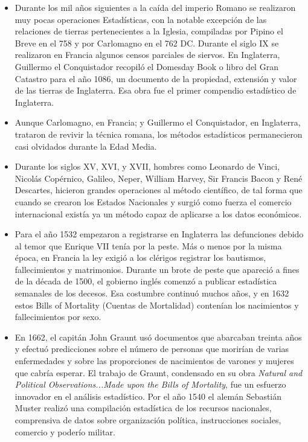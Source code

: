 \begin{itemize}
    \item Durante los mil a\~nos siguientes a la ca\'ida del imperio Romano se realizaron muy pocas operaciones Estad\'isticas, con la notable excepci\'on de las relaciones de tierras pertenecientes a la Iglesia, compiladas por Pipino el Breve en el 758 y por Carlomagno en el 762 DC. Durante el siglo IX se realizaron en Francia algunos censos parciales de siervos. En Inglaterra, Guillermo el Conquistador recopil\'o el Domesday Book o libro del Gran Catastro para el a\~no 1086, un documento de la propiedad, extensi\'on y valor de las tierras de Inglaterra. Esa obra fue el primer compendio estad\'istico de Inglaterra. 
    \item Aunque Carlomagno, en Francia; y Guillermo el Conquistador, en Inglaterra, trataron de revivir la t\'ecnica romana, los m\'etodos estad\'isticos permanecieron casi olvidados durante la Edad Media.
    \item Durante los siglos XV, XVI, y XVII, hombres como Leonardo de Vinci, Nicol\'as Cop\'ernico, Galileo, Neper, William Harvey, Sir Francis Bacon y Ren\'e Descartes, hicieron grandes operaciones al m\'etodo cient\'ifico, de tal forma que cuando se crearon los Estados Nacionales y surgi\'o como fuerza el comercio internacional exist\'ia ya un m\'etodo capaz de aplicarse a los datos econ\'omicos. 
    \item Para el a\~no 1532 empezaron a registrarse en Inglaterra las defunciones debido al temor que Enrique VII ten\'ia por la peste.  M\'as o menos por la misma \'epoca, en Francia la ley exigi\'o a los cl\'erigos registrar los bautismos, fallecimientos y matrimonios. Durante un brote de peste que apareci\'o a fines de la d\'ecada de 1500, el gobierno ingl\'es comenz\'o a publicar estad\'istica semanales de los decesos. Esa costumbre continu\'o muchos a\~nos, y en 1632 estos Bills of Mortality (Cuentas de Mortalidad) conten\'ian los nacimientos y fallecimientos por sexo.
    \item En 1662, el capit\'an John Graunt us\'o documentos que abarcaban treinta a\~nos y efectu\'o predicciones sobre el n\'umero de personas que morir\'ian de varias enfermedades y sobre las proporciones de nacimientos de varones y mujeres que cabr\'ia esperar. El trabajo de Graunt, condensado en su obra \textit{Natural and Political Observations...Made upon the Bills of Mortality}, fue un esfuerzo innovador en el an\'alisis estad\'istico. Por el a\~no 1540 el alem\'an Sebasti\'an Muster realiz\'o una compilaci\'on estad\'istica de los recursos nacionales, comprensiva de datos sobre organizaci\'on pol\'itica, instrucciones sociales, comercio y poder\'io militar. 

\end{itemize}
